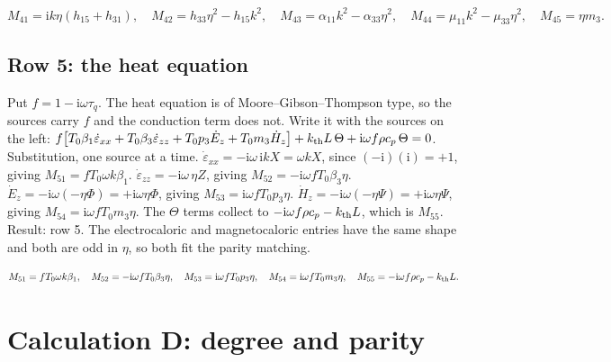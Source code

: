 \documentclass[11pt]{article}
\makeatletter
\newif\ifshowworked
\newenvironment{worked}{%
  \ifshowworked\par\smallskip\noindent\textit{Working.}\par\smallskip\else
  \setbox\z@\vbox\bgroup\fi}{\ifshowworked\par\smallskip\else\egroup\fi}
\newcommand{\ii}{\mathrm{i}}
\makeatother
\begin{document}
\begin{equation}
M_{41}=\ii k\eta(h_{15}+h_{31}),\quad
M_{42}=h_{33}\eta^2-h_{15}k^2,\quad
M_{43}=\alpha_{11}k^2-\alpha_{33}\eta^2,\quad
M_{44}=\mu_{11}k^2-\mu_{33}\eta^2,\quad
M_{45}=\eta m_3 .
\end{equation}

\subsection*{Row 5: the heat equation}

\begin{worked}
Put $f=1-\ii\omega\tau_q$. The heat equation is of Moore--Gibson--Thompson type, so the sources carry $f$
and the conduction term does not. Write it with the sources on the left:
$f\bigl[T_0\beta_1\dot\varepsilon_{xx}+T_0\beta_3\dot\varepsilon_{zz}+T_0p_3\dot E_z
+T_0m_3\dot H_z\bigr]+k_{\rm th}L\,\Theta+\ii\omega f\rho c_p\,\Theta=0$.
Substitution, one source at a time.
$\dot\varepsilon_{xx}=-\ii\omega\,\ii kX=\omega kX$, since $(-\ii)(\ii)=+1$, giving
$M_{51}=fT_0\omega k\beta_1$.
$\dot\varepsilon_{zz}=-\ii\omega\,\eta Z$, giving $M_{52}=-\ii\omega fT_0\beta_3\eta$.
$\dot E_z=-\ii\omega(-\eta\Phi)=+\ii\omega\eta\Phi$, giving $M_{53}=\ii\omega fT_0p_3\eta$.
$\dot H_z=-\ii\omega(-\eta\Psi)=+\ii\omega\eta\Psi$, giving $M_{54}=\ii\omega fT_0m_3\eta$.
The $\Theta$ terms collect to $-\ii\omega f\rho c_p-k_{\rm th}L$, which is $M_{55}$.
Result: row 5. The electrocaloric and magnetocaloric entries have the same shape and both are odd in
$\eta$, so both fit the parity matching.
\end{worked}

\begin{equation}
M_{51}=fT_0\omega k\beta_1,\quad
M_{52}=-\ii\omega fT_0\beta_3\eta,\quad
M_{53}=\ii\omega fT_0p_3\eta,\quad
M_{54}=\ii\omega fT_0m_3\eta,\quad
M_{55}=-\ii\omega f\rho c_p-k_{\rm th}L .
\end{equation}

\section{Calculation D: degree and parity}\label{sec:calcD}
\end{document}
